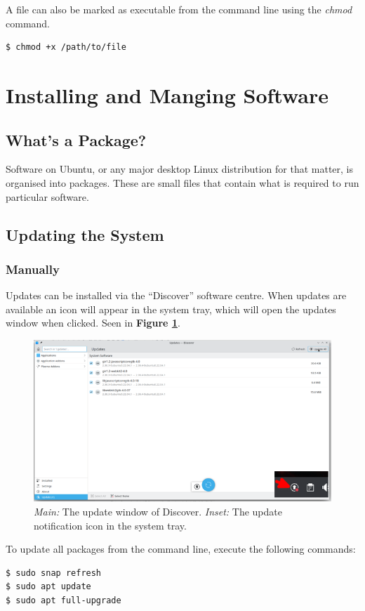 \documentclass[a4paper, 12pt]{article}
\begin{document}
A file can also be marked as executable from the command line using the \textit{chmod} command.

\begin{lstlisting}
$ chmod +x /path/to/file
\end{lstlisting}

\section{Installing and Manging Software}

\subsection{What's a Package?}

Software on Ubuntu, or any major desktop Linux distribution for that matter,
is organised into packages. These are small files that contain what is required to run particular software.

\subsection{Updating the System}

\subsubsection{Manually}
Updates can be installed via the ``Discover'' software centre. When updates are available an
icon will appear in the system tray, which will open the updates window when clicked. Seen in
\textbf{Figure \ref{fig:updates}}.

\begin{figure}[h]
    \centering
    \includegraphics[width=0.6\linewidth]{images/updates}
    \caption{\textit{Main:} The update window of Discover. \textit{Inset:} The update
    notification icon in the system tray.}\label{fig:updates}
\end{figure}


 To update all packages from the command line, execute the following commands:
\begin{lstlisting}
$ sudo snap refresh
$ sudo apt update
$ sudo apt full-upgrade
\end{lstlisting}
\end{document}
